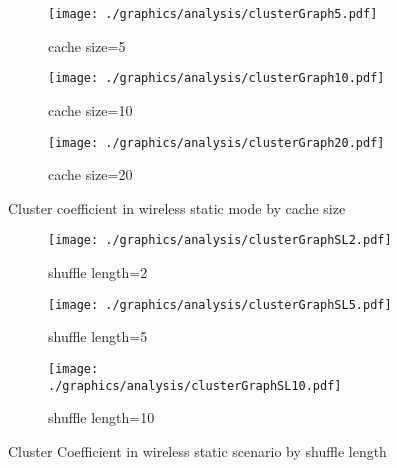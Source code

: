 \begin{figure}
\centering
\begin{subfigure}{\textwidth}
	\centering
	\texttt{[image: ./graphics/analysis/clusterGraph5.pdf]}
	\caption{ cache size=5}
	\label{fig:ClusterCoef5small}
\end{subfigure}
\begin{subfigure}{\textwidth}
	\centering
	\texttt{[image: ./graphics/analysis/clusterGraph10.pdf]}
	\caption{ cache size=10}
	\label{fig:ClusterCoef10small}
\end{subfigure}
\begin{subfigure}{\textwidth}
	\centering
	\texttt{[image: ./graphics/analysis/clusterGraph20.pdf]}
	\caption{cache size=20}
	\label{fig:ClusterCoef20small}
\end{subfigure}
\caption{Cluster coefficient in wireless static mode by cache size}
\label{fig:ClusterCoef}
\end{figure}

\begin{figure}
\begin{subfigure}{\textwidth}
	\centering
	\texttt{[image: ./graphics/analysis/clusterGraphSL2.pdf]}
	\caption{shuffle length=2}
	\label{fig:ClusterCoefSL2small}
\end{subfigure}
\begin{subfigure}{\textwidth}
	\centering
	\texttt{[image: ./graphics/analysis/clusterGraphSL5.pdf]}
	\caption{shuffle length=5}
	\label{fig:ClusterCoefSL5small}
\end{subfigure}
\begin{subfigure}{\textwidth}
	\centering
	\texttt{[image: ./graphics/analysis/clusterGraphSL10.pdf]}
	\caption{shuffle length=10}
	\label{fig:ClusterCoefSL10small}
\end{subfigure}
\caption{Cluster Coefficient in wireless static scenario by shuffle length}
\end{figure}

